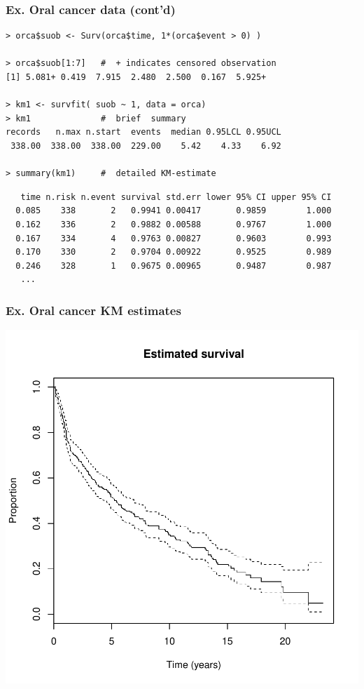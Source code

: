 \documentclass[handout,12pt,dvipsnames,t]{beamer}
\begin{document}
\begin{frame}[fragile]
\frametitle{Ex. Oral cancer data  (cont'd)}

\small
\begin{verbatim}
> orca$suob <- Surv(orca$time, 1*(orca$event > 0) )

> orca$suob[1:7]   #  + indicates censored observation
[1] 5.081+ 0.419  7.915  2.480  2.500  0.167  5.925+

> km1 <- survfit( suob ~ 1, data = orca)
> km1              #  brief  summary
records   n.max n.start  events  median 0.95LCL 0.95UCL 
 338.00  338.00  338.00  229.00    5.42    4.33    6.92 
 
> summary(km1)     #  detailed KM-estimate
\end{verbatim}
\scriptsize
\begin{verbatim}
   time n.risk n.event survival std.err lower 95% CI upper 95% CI
  0.085    338       2   0.9941 0.00417       0.9859        1.000
  0.162    336       2   0.9882 0.00588       0.9767        1.000
  0.167    334       4   0.9763 0.00827       0.9603        0.993
  0.170    330       2   0.9704 0.00922       0.9525        0.989
  0.246    328       1   0.9675 0.00965       0.9487        0.987
   ...  
\end{verbatim}

\normalsize

\end{frame}

\begin{frame}[fragile]
\frametitle{Ex. Oral cancer KM estimates}

\includegraphics{Survival_competing_risk-KM_plot}

\end{frame}
\end{document}
